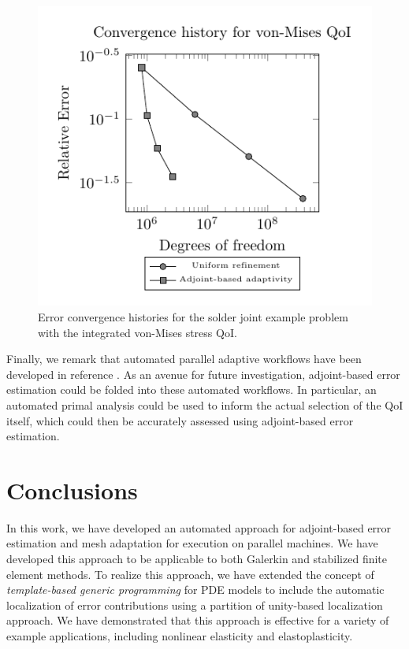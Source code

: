 \begin{figure}[ht!]
\centering
\includegraphics[width=0.75\linewidth]{img/aut_solder_convergence.pdf}
\caption{Error convergence histories for the solder joint example problem
with the integrated von-Mises stress QoI.}
\label{fig:aut_solder_convergence}
\end{figure}

Finally, we remark that automated parallel adaptive workflows
have been developed in reference \cite{bloomfield2017component}.
As an avenue for future investigation, adjoint-based error estimation
could be folded into these automated workflows.
In particular, an automated primal analysis could be used to inform
the actual selection of the QoI itself, which could then be accurately
assessed using adjoint-based error estimation.

\section{Conclusions}

In this work, we have developed an automated approach for
adjoint-based error estimation and mesh adaptation for
execution on parallel machines. We have developed this approach
to be applicable to both Galerkin and stabilized finite
element methods. To realize this approach, we have extended
the concept of \emph{template-based generic programming} for
PDE models to include the automatic localization of error
contributions using a partition of unity-based
localization approach. We have demonstrated that this approach
is effective for a variety of example applications, including
nonlinear elasticity and elastoplasticity.
